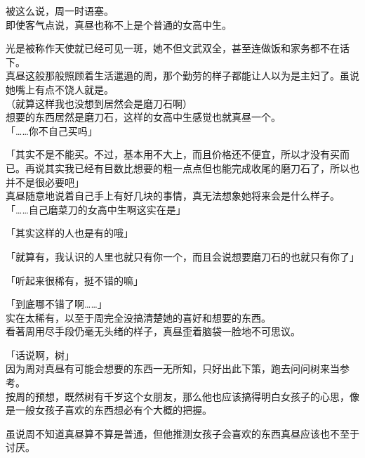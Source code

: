 被这么说，周一时语塞。\\

即使客气点说，真昼也称不上是个普通的女高中生。

光是被称作天使就已经可见一斑，她不但文武双全，甚至连做饭和家务都不在话下。\\

真昼这般那般照顾着生活邋遢的周，那个勤劳的样子都能让人以为是主妇了。虽说她嘴上有点不饶人就是。\\

（就算这样我也没想到居然会是磨刀石啊）\\

想要的东西居然是磨刀石，这样的女高中生感觉也就真昼一个。\\

「……你不自己买吗」

「其实不是不能买。不过，基本用不大上，而且价格还不便宜，所以才没有买而已。再说其实我已经有目数比想要的粗一点点但也能完成收尾的磨刀石了，所以也并不是很必要吧」\\%

真昼随意地说着自己手上有好几块的事情，真无法想象她将来会是什么样子。\\

「……自己磨菜刀的女高中生啊这实在是」

「其实这样的人也是有的哦」

「就算有，我认识的人里也就只有你一个，而且会说想要磨刀石的也就只有你了」

「听起来很稀有，挺不错的嘛」

「到底哪不错了啊……」\\

实在太稀有，以至于周完全没搞清楚她的喜好和想要的东西。\\

看著周用尽手段仍毫无头绪的样子，真昼歪着脑袋一脸地不可思议。\\

\vspace{2\baselineskip}

「话说啊，树」\\

因为周对真昼有可能会想要的东西一无所知，只好出此下策，跑去问问树来当参考。\\

按周的预想，既然树有千岁这个女朋友，那么他也应该搞得明白女孩子的心思，像是一般女孩子喜欢的东西想必有个大概的把握。

虽说周不知道真昼算不算是普通，但他推测女孩子会喜欢的东西真昼应该也不至于讨厌。\\

